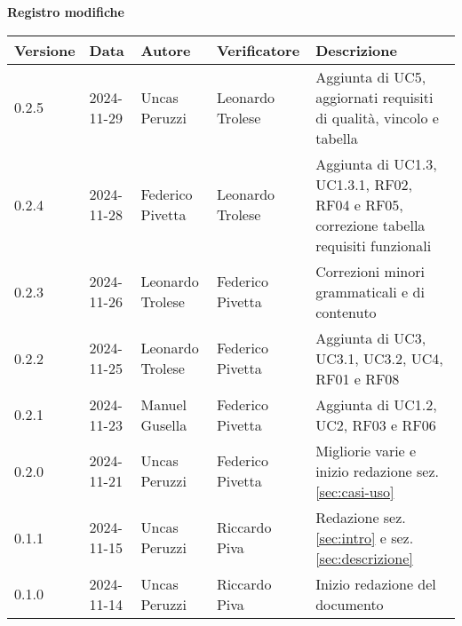 \documentclass[11pt]{article}
\begin{document}
\centering\textbf{Registro modifiche}\\
\vspace{2mm}
\begin{tabularx}{\textwidth}{|l|l|l|l|X|}
\hline
\textbf{Versione} & \textbf{Data} & \textbf{Autore} & \textbf{Verificatore} & \textbf{Descrizione} \\
\hline
0.2.5 & 2024-11-29 & Uncas Peruzzi & Leonardo Trolese & Aggiunta di UC5, aggiornati requisiti di qualità, vincolo e tabella \\
\hline
0.2.4 & 2024-11-28 & Federico Pivetta & Leonardo Trolese & Aggiunta di UC1.3, UC1.3.1, RF02, RF04 e RF05, correzione tabella requisiti funzionali \\
\hline
0.2.3 & 2024-11-26 & Leonardo Trolese  & Federico Pivetta & Correzioni minori grammaticali e di contenuto \\
\hline
0.2.2 & 2024-11-25 & Leonardo Trolese  & Federico Pivetta & Aggiunta di UC3, UC3.1, UC3.2, UC4, RF01 e RF08 \\
\hline
0.2.1 & 2024-11-23 & Manuel Gusella  & Federico Pivetta & Aggiunta di UC1.2, UC2, RF03 e RF06\\
\hline
0.2.0 & 2024-11-21 & Uncas Peruzzi  & Federico Pivetta & Migliorie varie e inizio redazione sez.\ref{sec:casi-uso} \\
\hline
0.1.1 & 2024-11-15 & Uncas Peruzzi  & Riccardo Piva & Redazione sez.\ref{sec:intro} e sez.\ref{sec:descrizione} \\
\hline
0.1.0 & 2024-11-14 & Uncas Peruzzi  & Riccardo Piva & Inizio redazione del documento\\
\hline
\end{tabularx}
\newpage
\tableofcontents
\newpage
\listoffigures %
\end{document}

